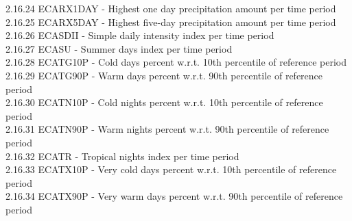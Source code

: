 \documentclass[xcolor=dvipsnames,compress,subsection=false]{beamer}
\begin{document}
{\begin{tiny}
  2.16.24  ECARX1DAY - Highest one day precipitation amount per time period \\
  2.16.25  ECARX5DAY - Highest five-day precipitation amount per time period \\
  2.16.26  ECASDII - Simple daily intensity index per time period \\
  2.16.27  ECASU - Summer days index per time period \\
  2.16.28  ECATG10P - Cold days percent w.r.t. 10th percentile of reference period \\
  2.16.29  ECATG90P - Warm days percent w.r.t. 90th percentile of reference period \\
  2.16.30  ECATN10P - Cold nights percent w.r.t. 10th percentile of reference period \\
  2.16.31  ECATN90P - Warm nights percent w.r.t. 90th percentile of reference period \\
  2.16.32  ECATR - Tropical nights index per time period \\
  2.16.33  ECATX10P - Very cold days percent w.r.t. 10th percentile of reference period \\
  2.16.34  ECATX90P - Very warm days percent w.r.t. 90th percentile of reference period \\
\end{tiny}
}

\end{document}
